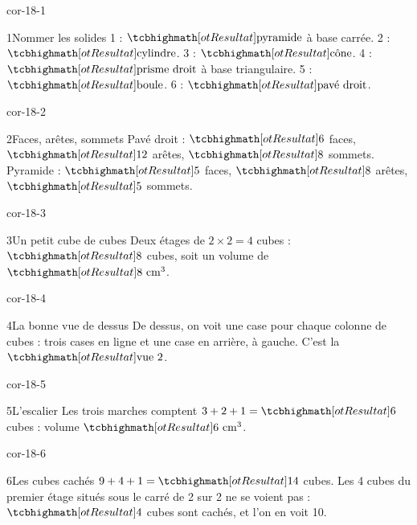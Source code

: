 \clearpage\pagestyle{otMain}\setlength{\otBlocEspacement}{2.5mm}\fontsize{11}{15}\selectfont{}
\begin{blocLivre}{cor-18-1}\begin{corrige}{1}{Nommer les solides}
1 : $\res{\text{pyramide}}$ à base carrée. 2 : $\res{\text{cylindre}}$. 3 : $\res{\text{cône}}$. 4 : $\res{\text{prisme droit}}$ à base triangulaire. 5 : $\res{\text{boule}}$. 6 : $\res{\text{pavé droit}}$.
\label{fig-cor-18-1}
\end{corrige}\end{blocLivre}
\begin{blocLivre}{cor-18-2}\begin{corrige}{2}{Faces, arêtes, sommets}
Pavé droit : $\res{6}$ faces, $\res{12}$ arêtes, $\res{8}$ sommets. Pyramide : $\res5$ faces, $\res8$ arêtes, $\res5$ sommets.
\label{fig-cor-18-2}
\end{corrige}\end{blocLivre}
\begin{blocLivre}{cor-18-3}\begin{corrige}{3}{Un petit cube de cubes}
Deux étages de $2\times2=4$ cubes : $\res8$ cubes, soit un volume de $\res{8\ \mathrm{cm}^3}$.
\label{fig-cor-18-3}
\end{corrige}\end{blocLivre}
\begin{blocLivre}{cor-18-4}\begin{corrige}{4}{La bonne vue de dessus}
De dessus, on voit une case pour chaque colonne de cubes : trois cases en ligne et une case en arrière, à gauche. C’est la $\res{\text{vue 2}}$.
\label{fig-cor-18-4}
\end{corrige}\end{blocLivre}
\begin{blocLivre}{cor-18-5}\begin{corrige}{5}{L’escalier}
Les trois marches comptent $3+2+1=\res6$ cubes : volume $\res{6\ \mathrm{cm}^3}$.
\label{fig-cor-18-5}
\end{corrige}\end{blocLivre}
\begin{blocLivre}{cor-18-6}\begin{corrige}{6}{Les cubes cachés}
$9+4+1=\res{14}$ cubes. Les 4 cubes du premier étage situés sous le carré de 2 sur 2 ne se voient pas : $\res4$ cubes sont cachés, et l’on en voit 10.
\label{fig-cor-18-6}
\end{corrige}\end{blocLivre}
